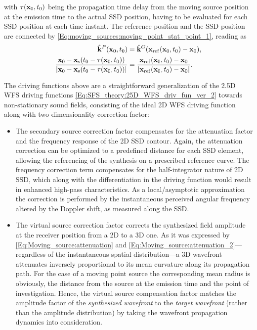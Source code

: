with $\tau(\mathbf{x}_0,t_0)$ being the propagation time delay from the moving source position at the emission time to the actual SSD position, having to be evaluated for each SSD position at each time instant.
The reference position and the SSD position are connected by \eqref{Eq:moving_sources:moving_point_stat_point_1}, reading as
\begin{align}
\label{Eq:SFS_theory:25D_WFS_ref_point}
\hat{\mathbf{k}}^P(\mathbf{x}_0,t_0) &= \hat{\mathbf{k}}^G(\mathbf{x}_{\mathrm{ref}}(\mathbf{x}_0,t_0)-\mathbf{x}_0),
\\
\frac{\mathbf{x}_0 -\mathbf{x}_{\mathrm{s}}(t_0-\tau(\mathbf{x}_0,t_0))}{|\mathbf{x}_0-\mathbf{x}_{\mathrm{s}}(t_0 - \tau(\mathbf{x}_0,t_0))|} &=  \frac{\mathbf{x}_{\mathrm{ref}}(\mathbf{x}_0,t_0)-\mathbf{x}_0}{|\mathbf{x}_{\mathrm{ref}}(\mathbf{x}_0,t_0)-\mathbf{x}_0|}.
\end{align}

The driving functions above are a straightforward generalization of the 2.5D WFS driving functions \eqref{Eq:SFS_theory:25D_WFS_driv_fun_ver_2} towards non-stationary sound fields, consisting of the ideal 2D WFS driving function along with two dimensionality correction factor:
\begin{itemize}
\item The secondary source correction factor compensates for the attenuation factor and the frequency response of the 2D SSD contour.
Again, the attenuation correction can be optimized to a predefined distance for each SSD element, allowing the referencing of the synthesis on a prescribed reference curve.
The frequency correction term compensates for the half-integrator nature of 2D SSD, which along with the differentiation in the driving function would result in enhanced high-pass characteristics.
As a local/asymptotic approximation the correction is performed by the instantaneous perceived angular frequency altered by the Doppler shift, as measured along the SSD.
\item The virtual source correction factor corrects the synthesized field amplitude at the receiver position from a 2D to a 3D one.
As it was expressed by \eqref{Eq:Moving_source:attenuation} and \eqref{Eq:Moving_source:attenuation_2}---regardless of the instantaneous spatial distribution---a 3D wavefront attenuates inversely proportional to its mean curvature along its propagation path.
For the case of a moving point source the corresponding mean radius is obviously, the distance from the source at the emission time and the point of investigation.
Hence, the virtual source compensation factor matches the amplitude factor of the \emph{synthesized wavefront} to the \emph{target wavefront} (rather than the amplitude distribution) by taking the wavefront propagation dynamics into consideration.
\end{itemize}
